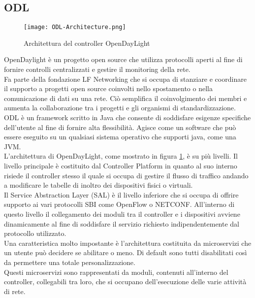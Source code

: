 \subsection{ODL}
\begin{figure}[h]
    \centering
   \texttt{[image: ODL-Architecture.png]}
    \caption{Architettura del controller OpenDayLight}
    \label{fig:ArchODL}
\end{figure}
OpenDaylight\cite{ODL} è un progetto open source che utilizza protocolli aperti al fine di fornire controlli centralizzati e gestire il monitoring della rete.
\\Fa parte della fondazione LF Networking \cite{LFN} che si occupa di stanziare e coordinare il supporto a progetti open source coinvolti nello spostamento o nella comunicazione di dati su una rete.
Ciò semplifica il coinvolgimento dei membri e aumenta la collaborazione tra i progetti e gli organismi di standardizzazione.
\\ODL è un framework scritto in Java che consente di soddisfare esigenze specifiche dell'utente al fine di fornire alta flessibilità. Agisce come un software che può essere eseguito su un qualsiasi sistema operativo che supporti java, come una JVM.
\\L'architettura di OpenDayLight, come mostrato in figura \ref{fig:ArchODL}, è su più livelli. 
Il livello principale è costituito dal Controller Platform in quanto al suo interno risiede il controller stesso il quale si 
occupa di gestire il flusso di traffico andando a modificare le tabelle di inoltro dei dispositivi fisici o virtuali. 
\\Il Service Abstraction Layer (SAL) è il livello inferiore che si occupa di offrire supporto ai vari protocolli SBI come OpenFlow o NETCONF. 
All'interno di questo livello il collegamento dei moduli tra il controller e i dispositivi avviene dinamicamente al fine di soddisfare il servizio richiesto indipendentemente dal protocollo utilizzato.
\\Una caratteristica molto impostante è l'architettura costituita da microservizi che un utente può decidere se abilitare o meno. 
Di default sono tutti disabilitati così da permettere una totale personalizzazione.
\\Questi microservizi sono rappresentati da moduli, contenuti all'interno del controller, collegabili tra loro, che si occupano dell'esecuzione delle varie attività di rete.
